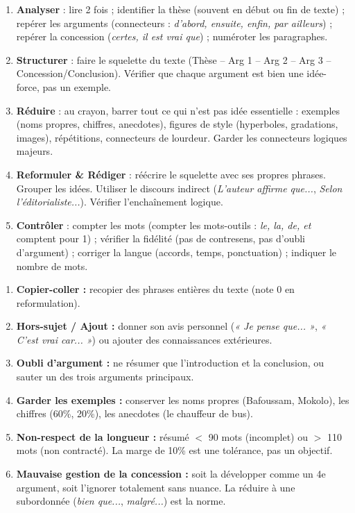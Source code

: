 \documentclass[11pt]{article}
\newcounter{popsec}
\newcounter{popsub}
\newcommand{\courssub}[1]{%
  \stepcounter{popsub}%
  \par\vspace{9pt}\noindent{\popxbold\fontsize{11.5}{13}\selectfont\color{popink}{\color{poporange}\thepopsec.\thepopsub}\hspace{6pt}#1}\par\nopagebreak\vspace{4pt}
}
\begin{document}
\begin{methode}
\begin{enumerate}
\item \textbf{Analyser} : lire 2 fois ; identifier la thèse (souvent en début ou fin de texte) ; repérer les arguments (connecteurs : \emph{d'abord, ensuite, enfin, par ailleurs}) ; repérer la concession (\emph{certes, il est vrai que}) ; numéroter les paragraphes.
\item \textbf{Structurer} : faire le squelette du texte (Thèse -- Arg 1 -- Arg 2 -- Arg 3 -- Concession/Conclusion). Vérifier que chaque argument est bien une idée-force, pas un exemple.
\item \textbf{Réduire} : au crayon, barrer tout ce qui n'est pas idée essentielle : exemples (noms propres, chiffres, anecdotes), figures de style (hyperboles, gradations, images), répétitions, connecteurs de lourdeur. Garder les connecteurs logiques majeurs.
\item \textbf{Reformuler \& Rédiger} : réécrire le squelette avec ses propres phrases. Grouper les idées. Utiliser le discours indirect (\emph{L'auteur affirme que...}, \emph{Selon l'éditorialiste...}). Vérifier l'enchaînement logique.
\item \textbf{Contrôler} : compter les mots (compter les mots-outils : \emph{le, la, de, et} comptent pour 1) ; vérifier la fidélité (pas de contresens, pas d'oubli d'argument) ; corriger la langue (accords, temps, ponctuation) ; indiquer le nombre de mots.
\end{enumerate}
\end{methode}

\courssub{Attention : Pièges fréquents à l'épreuve}

\begin{attention}
\begin{enumerate}
\item \textbf{Copier-coller :} recopier des phrases entières du texte (note 0 en reformulation).
\item \textbf{Hors-sujet / Ajout :} donner son avis personnel (\emph{« Je pense que... »}, \emph{« C'est vrai car... »}) ou ajouter des connaissances extérieures.
\item \textbf{Oubli d'argument :} ne résumer que l'introduction et la conclusion, ou sauter un des trois arguments principaux.
\item \textbf{Garder les exemples :} conserver les noms propres (Bafoussam, Mokolo), les chiffres (60\%, 20\%), les anecdotes (le chauffeur de bus).
\item \textbf{Non-respect de la longueur :} résumé $<$ 90 mots (incomplet) ou $>$ 110 mots (non contracté). La marge de 10\% est une tolérance, pas un objectif.
\item \textbf{Mauvaise gestion de la concession :} soit la développer comme un 4e argument, soit l'ignorer totalement sans nuance. La réduire à une subordonnée (\emph{bien que...}, \emph{malgré...}) est la norme.
\end{enumerate}
\end{attention}
\end{document}
